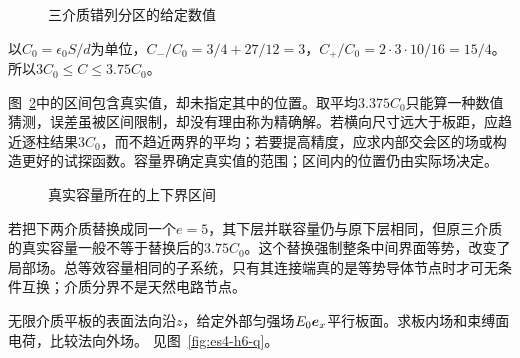 \begin{figure}[H]\centering
{}
\caption{三介质错列分区的给定数值}\label{fig:es4-h5-q}
\end{figure}
\begin{solution}
以$C_0=\epsilon_0S/d$为单位，$C_-/C_0=3/4+27/12=3$，$C_+/C_0=2\cdot3\cdot10/16=15/4$。所以$3C_0\le C\le3.75C_0$。

图~\ref{fig:es4-h5-s}中的区间包含真实值，却未指定其中的位置。取平均$3.375C_0$只能算一种数值猜测，误差虽被区间限制，却没有理由称为精确解。若横向尺寸远大于板距，应趋近逐柱结果$3C_0$，而不趋近两界的平均；若要提高精度，应求内部交会区的场或构造更好的试探函数。容量界确定真实值的范围；区间内的位置仍由实际场决定。
\begin{figure}[H]\centering
{}
\caption{真实容量所在的上下界区间}\label{fig:es4-h5-s}
\end{figure}


若把下两介质替换成同一个$e=5$，其下层并联容量仍与原下层相同，但原三介质的真实容量一般不等于替换后的$3.75C_0$。这个替换强制整条中间界面等势，改变了局部场。总等效容量相同的子系统，只有其连接端真的是等势导体节点时才可无条件互换；介质分界不是天然电路节点。
\end{solution}

\begin{exercise}[与场平行的无限介质板]\label{ex:es4-h6}
无限介质平板的表面法向沿$z$，给定外部匀强场$E_0\bm{e}_x$平行板面。求板内场和束缚面电荷，比较法向外场。 见图~\ref{fig:es4-h6-q}。
\end{exercise}

